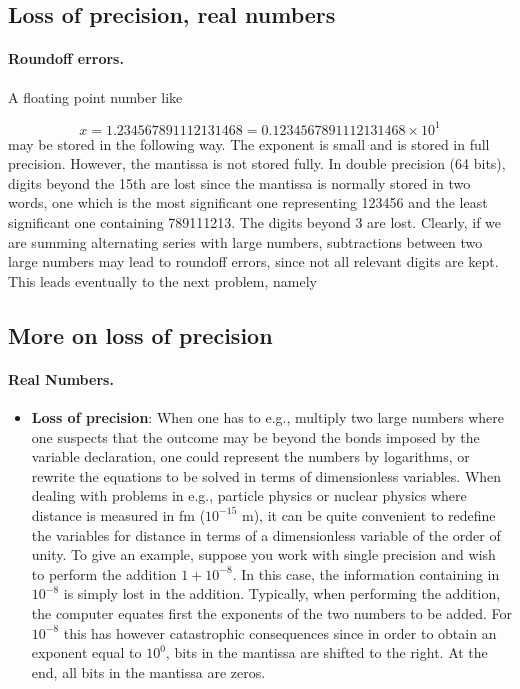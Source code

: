 \documentclass[%
twoside,                 %
final,                   %
10pt]{article}
\newenvironment{paragraphadmon}[1][]{\paragraph{#1}}{}
\begin{document}
\subsection{Loss of precision, real numbers}



\paragraph{Roundoff errors.}
A floating point number like

\begin{equation}
   x= 1.234567891112131468 = 0.1234567891112131468\times 10^{1}
\end{equation}
may be stored in the following way. The exponent is  small
and is stored in full precision. However,
the mantissa is not stored fully. In double precision (64 bits), digits
beyond the
15th are lost since the mantissa is normally stored in two words,
one which is the most significant one representing
123456 and the least significant one containing 789111213. The digits
beyond 3 are lost. Clearly, if we are summing alternating series
with large numbers, subtractions between two large numbers may lead
to roundoff errors, since not all relevant digits are kept.
This leads eventually to the next problem, namely

\subsection{More on loss of precision}


\begin{paragraphadmon}[Real Numbers.]

\begin{itemize}
  \item \textbf{Loss of precision}: When one has to e.g., multiply two large numbers where one suspects that the outcome may be beyond the bonds imposed by the variable declaration, one could represent the numbers by logarithms, or rewrite the equations to be solved in terms of dimensionless variables. When dealing with problems in e.g., particle physics or nuclear physics where distance is measured in fm ($10^{-15}$ m), it can be quite convenient to redefine the variables for distance in terms of a dimensionless variable of the order of unity. To give an example, suppose you work with single precision and wish to perform the addition $1+10^{-8}$. In this case, the information containing in $10^{-8}$ is simply lost in the addition. Typically, when performing the addition, the computer equates first the exponents of the two numbers to be added. For $10^{-8}$ this has however catastrophic consequences since in order to obtain an exponent equal to $10^0$, bits in the mantissa are shifted to the right. At the end, all bits in the mantissa are zeros.
\end{itemize}

\noindent
\end{paragraphadmon}
\end{document}
